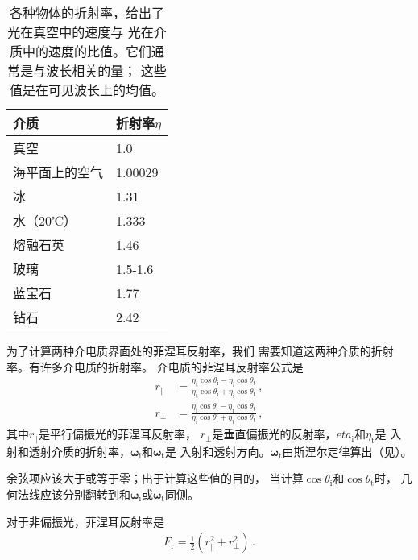 \begin{table}[htbp]
    \centering
    \begin{tabular}{ll}
        \toprule
        \textbf{介质}  & \textbf{折射率}$\eta$ \\
        \midrule
        真空           & 1.0                   \\
        海平面上的空气 & 1.00029               \\
        冰             & 1.31                  \\
        水（20℃）      & 1.333                 \\
        熔融石英       & 1.46                  \\
        玻璃           & 1.5-1.6               \\
        蓝宝石         & 1.77                  \\
        钻石           & 2.42                  \\
        \bottomrule
    \end{tabular}
    \caption{各种物体的折射率，给出了光在真空中的速度与
        光在介质中的速度的比值。它们通常是与波长相关的量；
        这些值是在可见波长上的均值。}
    \label{tab:8.1}
\end{table}

为了计算两种介电质界面处的菲涅耳反射率，我们
需要知道这两种介质的折射率。有许多介电质的折射率。
介电质的菲涅耳反射率公式是
\begin{align*}
    r_{\parallel} & =\frac{\eta_{\mathrm{t}}\cos\theta_{\mathrm{i}}-\eta_{\mathrm{i}}\cos\theta_{\mathrm{t}}}{\eta_{\mathrm{t}}\cos\theta_{\mathrm{i}}+\eta_{\mathrm{i}}\cos\theta_{\mathrm{t}}}\, , \\
    r_{\perp}     & =\frac{\eta_{\mathrm{i}}\cos\theta_{\mathrm{i}}-\eta_{\mathrm{t}}\cos\theta_{\mathrm{t}}}{\eta_{\mathrm{i}}\cos\theta_{\mathrm{i}}+\eta_{\mathrm{t}}\cos\theta_{\mathrm{t}}}\, ,
\end{align*}
其中$r_{\parallel}$是平行偏振光的菲涅耳反射率，
$r_{\perp}$是垂直偏振光的反射率，$eta_{\mathrm{i}}$和$\eta_{\mathrm{t}}$是
入射和透射介质的折射率，$\bm\omega_{\mathrm{i}}$和$\bm\omega_{\mathrm{t}}$是
入射和透射方向。$\bm\omega_{\mathrm{t}}$由斯涅尔定律算出（见）。

余弦项应该大于或等于零；出于计算这些值的目的，
当计算$\cos\theta_{\mathrm{i}}$和$\cos\theta_{\mathrm{t}}$时，
几何法线应该分别翻转到和$\bm\omega_{\mathrm{i}}$或$\bm\omega_{\mathrm{t}}$同侧。

对于非偏振光，菲涅耳反射率是
\begin{align*}
    F_{\mathrm{r}}=\frac{1}{2}(r_{\parallel}^2+r_{\perp}^2)\, .
\end{align*}

